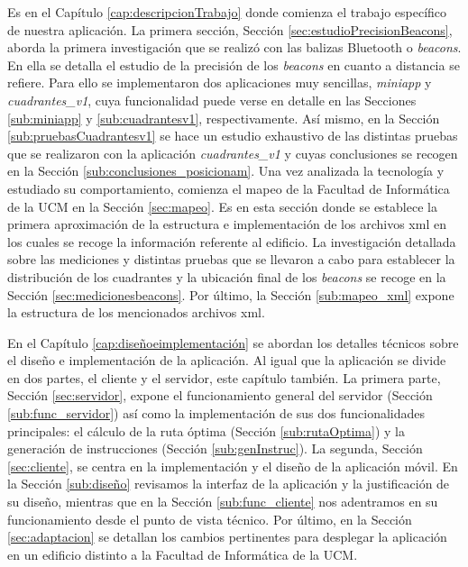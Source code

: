 Es en el Capítulo \ref{cap:descripcionTrabajo} donde comienza el trabajo específico de nuestra aplicación. La primera sección, Sección \ref{sec:estudioPrecisionBeacons}, aborda la primera investigación que se realizó con las balizas Bluetooth o \textit{beacons}. En ella se detalla el estudio de la precisión de los \textit{beacons} en cuanto a distancia se refiere. Para ello se implementaron dos aplicaciones muy sencillas, \textit{miniapp} y \textit{cuadrantes\_v1}, cuya funcionalidad puede verse en detalle en las Secciones \ref{sub:miniapp} y \ref{sub:cuadrantesv1}, respectivamente. Así mismo, en la Sección \ref{sub:pruebasCuadrantesv1} se hace un estudio exhaustivo de las distintas pruebas que se realizaron con la aplicación \textit{cuadrantes\_v1} y cuyas conclusiones se recogen en la Sección \ref{sub:conclusiones_posicionam}. Una vez analizada la tecnología y estudiado su comportamiento, comienza el mapeo de la Facultad de Informática de la UCM en la Sección \ref{sec:mapeo}. Es en esta sección donde se establece la primera aproximación de la estructura e implementación de los archivos xml en los cuales se recoge la información referente al edificio. La investigación detallada sobre las mediciones y distintas pruebas que se llevaron a cabo para establecer la distribución de los cuadrantes y la ubicación final de los \textit{beacons} se recoge en la Sección \ref{sec:medicionesbeacons}. Por último, la Sección \ref{sub:mapeo_xml} expone la estructura de los mencionados archivos xml.

En el Capítulo \ref{cap:diseñoeimplementación} se abordan los detalles técnicos sobre el diseño e implementación de la aplicación. Al igual que la aplicación se divide en dos partes, el cliente y el servidor, este capítulo también. La primera parte, Sección \ref{sec:servidor}, expone el funcionamiento general del servidor (Sección \ref{sub:func_servidor}) así como la implementación de sus dos funcionalidades principales: el cálculo de la ruta óptima (Sección \ref{sub:rutaOptima}) y la generación de instrucciones (Sección \ref{sub:genInstruc}). La segunda, Sección \ref{sec:cliente}, se centra en la implementación y el diseño de la aplicación móvil. En la Sección \ref{sub:diseño} revisamos la interfaz de la aplicación y la justificación de su diseño, mientras que en la Sección \ref{sub:func_cliente} nos adentramos en su funcionamiento desde el punto de vista técnico. Por último, en la Sección \ref{sec:adaptacion} se detallan los cambios pertinentes para desplegar la aplicación en un edificio distinto a la Facultad de Informática de la UCM.

